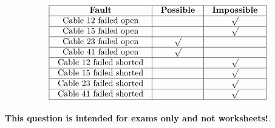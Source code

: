 






$$\vbox{\offinterlineskip
\halign{\strut
\vrule \quad\hfil # \ \hfil & 
\vrule \quad\hfil # \ \hfil & 
\vrule \quad\hfil # \ \hfil \vrule \cr
\noalign{\hrule}
%
{\bf Fault} & {\bf Possible} & {\bf Impossible} \cr
%
\noalign{\hrule}
%
Cable 12 failed open &  & $\surd$ \cr
%
\noalign{\hrule}
%
Cable 15 failed open &  & $\surd$ \cr
%
\noalign{\hrule}
%
Cable 23 failed open & $\surd$ &  \cr
%
\noalign{\hrule}
%
Cable 41 failed open & $\surd$ &  \cr
%
\noalign{\hrule}
%
Cable 12 failed shorted &  & $\surd$ \cr
%
\noalign{\hrule}
%
Cable 15 failed shorted &  & $\surd$ \cr
%
\noalign{\hrule}
%
Cable 23 failed shorted &  & $\surd$ \cr
%
\noalign{\hrule}
%
Cable 41 failed shorted &  & $\surd$ \cr
%
\noalign{\hrule}
} %
}$$ %







{\bf This question is intended for exams only and not worksheets!}.



